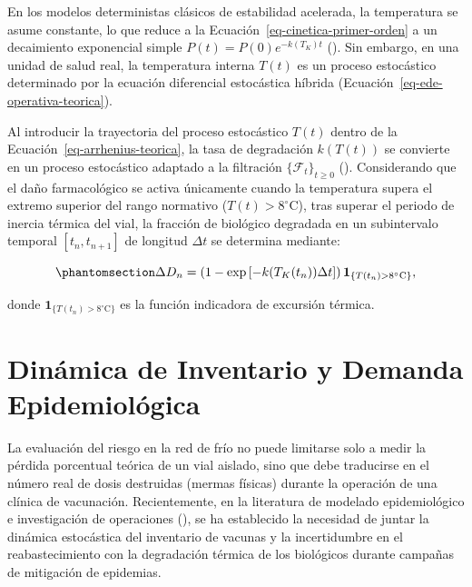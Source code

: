 \documentclass[
  spanish,
  us-letterpaper,
]{scrreprt}
\numberwithin{equation}{section}
\theoremstyle{plain}
\theoremstyle{plain}
\theoremstyle{plain}
\theoremstyle{definition}
\theoremstyle{remark}
\begin{document}
En los modelos deterministas clásicos de estabilidad acelerada, la
temperatura se asume constante, lo que reduce a la
Ecuación~\ref{eq-cinetica-primer-orden} a un decaimiento exponencial
simple \(P(t) = P(0)e^{-k(T_K)t}\)
(). Sin
embargo, en una unidad de salud real, la temperatura interna \(T(t)\) es
un proceso estocástico determinado por la ecuación diferencial
estocástica híbrida (Ecuación~\ref{eq-ede-operativa-teorica}).

Al introducir la trayectoria del proceso estocástico \(T(t)\) dentro de
la Ecuación~\ref{eq-arrhenius-teorica}, la tasa de degradación
\(k(T(t))\) se convierte en un proceso estocástico adaptado a la
filtración \(\{\mathcal{F}_t\}_{t \ge 0}\)
(). Considerando que el daño farmacológico se activa únicamente
cuando la temperatura supera el extremo superior del rango normativo
(\(T(t) > 8^\circ\text{C}\)), tras superar el periodo de inercia térmica
del vial, la fracción de biológico degradada en un subintervalo temporal
\([t_n, t_{n+1}]\) de longitud \(\Delta t\) se determina mediante:

\begin{equation}\phantomsection\label{eq-fraccion-dano-paso}{
\Delta D_n = \left( 1 - \exp\left[ -k(T_K(t_n)) \Delta t \right] \right) \mathbf{1}_{\{T(t_n) > 8^\circ\text{C}\}},
}\end{equation}

donde \(\mathbf{1}_{\{T(t_n) > 8^\circ\text{C}\}}\) es la función
indicadora de excursión térmica.

\section{Dinámica de Inventario y Demanda
Epidemiológica}\label{sec-fundamento-inventario-seir}

La evaluación del riesgo en la red de frío no puede limitarse solo a
medir la pérdida porcentual teórica de un vial aislado, sino que debe
traducirse en el número real de dosis destruidas (mermas físicas)
durante la operación de una clínica de vacunación. Recientemente, en la
literatura de modelado epidemiológico e investigación de operaciones
(), se ha establecido la necesidad de juntar la dinámica estocástica
del inventario de vacunas y la incertidumbre en el reabastecimiento con
la degradación térmica de los biológicos durante campañas de mitigación
de epidemias.
\end{document}

